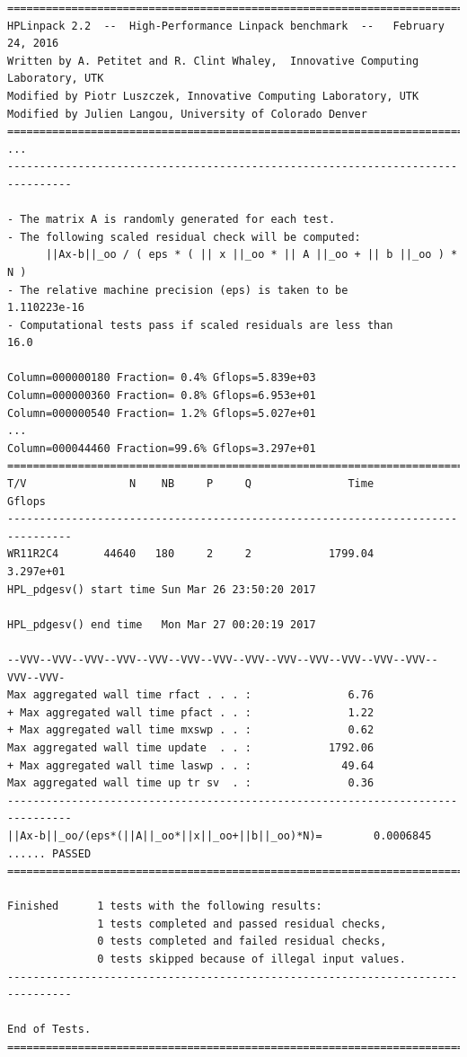 \documentclass{article}
\begin{document}
        \begin{verbatim}
================================================================================
HPLinpack 2.2  --  High-Performance Linpack benchmark  --   February 24, 2016
Written by A. Petitet and R. Clint Whaley,  Innovative Computing Laboratory, UTK
Modified by Piotr Luszczek, Innovative Computing Laboratory, UTK
Modified by Julien Langou, University of Colorado Denver
================================================================================
...
--------------------------------------------------------------------------------

- The matrix A is randomly generated for each test.
- The following scaled residual check will be computed:
      ||Ax-b||_oo / ( eps * ( || x ||_oo * || A ||_oo + || b ||_oo ) * N )
- The relative machine precision (eps) is taken to be               1.110223e-16
- Computational tests pass if scaled residuals are less than                16.0

Column=000000180 Fraction= 0.4% Gflops=5.839e+03
Column=000000360 Fraction= 0.8% Gflops=6.953e+01
Column=000000540 Fraction= 1.2% Gflops=5.027e+01
...
Column=000044460 Fraction=99.6% Gflops=3.297e+01
================================================================================
T/V                N    NB     P     Q               Time                 Gflops
--------------------------------------------------------------------------------
WR11R2C4       44640   180     2     2            1799.04              3.297e+01
HPL_pdgesv() start time Sun Mar 26 23:50:20 2017

HPL_pdgesv() end time   Mon Mar 27 00:20:19 2017

--VVV--VVV--VVV--VVV--VVV--VVV--VVV--VVV--VVV--VVV--VVV--VVV--VVV--VVV--VVV-
Max aggregated wall time rfact . . . :               6.76
+ Max aggregated wall time pfact . . :               1.22
+ Max aggregated wall time mxswp . . :               0.62
Max aggregated wall time update  . . :            1792.06
+ Max aggregated wall time laswp . . :              49.64
Max aggregated wall time up tr sv  . :               0.36
--------------------------------------------------------------------------------
||Ax-b||_oo/(eps*(||A||_oo*||x||_oo+||b||_oo)*N)=        0.0006845 ...... PASSED
================================================================================

Finished      1 tests with the following results:
              1 tests completed and passed residual checks,
              0 tests completed and failed residual checks,
              0 tests skipped because of illegal input values.
--------------------------------------------------------------------------------

End of Tests.
================================================================================

        \end{verbatim}
\end{document}
